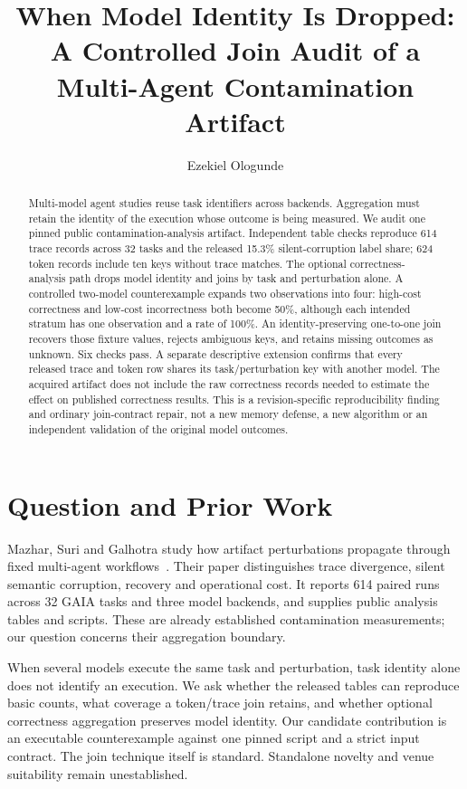 \documentclass[sigconf,nonacm]{acmart}
\title{When Model Identity Is Dropped: A Controlled Join Audit of a Multi-Agent Contamination Artifact}
\author{Ezekiel Ologunde}
\begin{document}
\begin{abstract}
Multi-model agent studies reuse task identifiers across backends. Aggregation must retain the identity of the execution whose outcome is being measured. We audit one pinned public contamination-analysis artifact. Independent table checks reproduce 614 trace records across 32 tasks and the released 15.3\% silent-corruption label share; 624 token records include ten keys without trace matches. The optional correctness-analysis path drops model identity and joins by task and perturbation alone. A controlled two-model counterexample expands two observations into four: high-cost correctness and low-cost incorrectness both become 50\%, although each intended stratum has one observation and a rate of 100\%. An identity-preserving one-to-one join recovers those fixture values, rejects ambiguous keys, and retains missing outcomes as unknown. Six checks pass. A separate descriptive extension confirms that every released trace and token row shares its task/perturbation key with another model. The acquired artifact does not include the raw correctness records needed to estimate the effect on published correctness results. This is a revision-specific reproducibility finding and ordinary join-contract repair, not a new memory defense, a new algorithm or an independent validation of the original model outcomes.
\end{abstract}
\maketitle

\section{Question and Prior Work}
Mazhar, Suri and Galhotra study how artifact perturbations propagate through fixed multi-agent workflows~\cite{mazhar}. Their paper distinguishes trace divergence, silent semantic corruption, recovery and operational cost. It reports 614 paired runs across 32 GAIA tasks and three model backends, and supplies public analysis tables and scripts. These are already established contamination measurements; our question concerns their aggregation boundary.

When several models execute the same task and perturbation, task identity alone does not identify an execution. We ask whether the released tables can reproduce basic counts, what coverage a token/trace join retains, and whether optional correctness aggregation preserves model identity. Our candidate contribution is an executable counterexample against one pinned script and a strict input contract. The join technique itself is standard. Standalone novelty and venue suitability remain unestablished.
\end{document}

